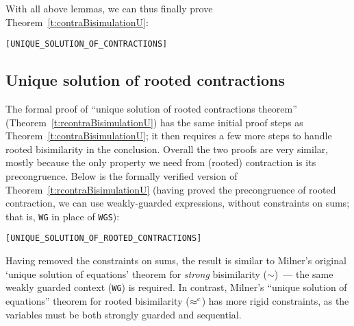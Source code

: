 With all above lemmas, we can thus finally prove Theorem~\ref{t:contraBisimulationU}:
\begin{alltt}
\HOLTokenTurnstile{}   \HOLSymConst{\HOLTokenConj{}}  \HOLSymConst{\HOLTokenContracts{}}   \HOLSymConst{\HOLTokenConj{}}  \HOLSymConst{\HOLTokenContracts{}}   \HOLSymConst{\HOLTokenImp{}}  \HOLSymConst{\HOLTokenWeakEQ} \hfill{[UNIQUE_SOLUTION_OF_CONTRACTIONS]}
\end{alltt}

\subsection{Unique solution of rooted contractions}

The formal proof of ``unique solution of rooted contractions theorem''
(Theorem~\ref{t:rcontraBisimulationU}) has the
same initial proof steps as Theorem~\ref{t:contraBisimulationU}; 
it then requires a
few more steps to handle  rooted bisimilarity in the conclusion. 
Overall  the
two proofs are very similar, mostly because the only property we need
from (rooted) contraction is its precongruence. 
 Below is the formally verified version of
Theorem~\ref{t:rcontraBisimulationU}
(having proved
the precongruence of rooted contraction, 
we can use  weakly-guarded expressions,   without constraints on  sums;
that is, \texttt{WG} in place of \texttt{WGS}):
\begin{alltt}
\HOLTokenTurnstile{}   \HOLSymConst{\HOLTokenConj{}}  \HOLSymConst{\HOLTokenObsContracts}   \HOLSymConst{\HOLTokenConj{}}  \HOLSymConst{\HOLTokenObsContracts}   \HOLSymConst{\HOLTokenImp{}}  \HOLSymConst{\HOLTokenObsCongr} \hfill{[UNIQUE_SOLUTION_OF_ROOTED_CONTRACTIONS]}
\end{alltt}

Having removed the  constraints on sums, the result is
 similar to Milner's original `unique solution of
equations' theorem for \emph{strong} bisimilarity ($\sim$)~--- 
the same weakly guarded context (\texttt{WG}) is required.
In contrast, Milner's ``unique solution of
equations'' theorem for rooted bisimilarity ($\mathrel{\approx^{\rm{c}}}$)
has more rigid constraints, as the variables must be both strongly guarded and sequential.
